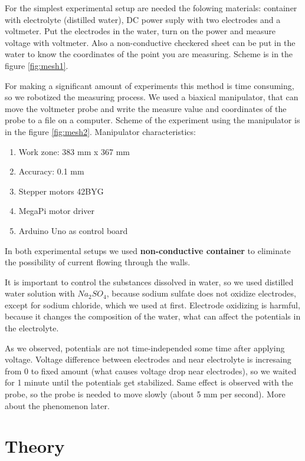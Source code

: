 \documentclass{article}
\begin{document}
For the simplest experimental setup are needed the folowing materials: container with electrolyte (distilled water), DC power suply with two electrodes and a voltmeter. Put the electrodes in the water, turn on the power and measure voltage with voltmeter. Also a non-conductive checkered sheet can be put in the water to know the coordinates of the point you are measuring. Scheme is in the figure \ref{fig:mesh1}.  \par

For making a significant amount of experiments this method is time consuming, so we robotized the measuring process. We used a biaxical manipulator, that can move the voltmeter probe and write the measure value and coordinates of the probe to a file on a computer. Scheme of the experiment using the manipulator is in the figure \ref{fig:mesh2}. Manipulator characteristics:
\begin{enumerate}
\item Work zone: 383 mm x 367 mm
\item Accuracy: 0.1 mm
\item Stepper motors 42BYG
\item MegaPi motor driver
\item Arduino Uno as control board
\end{enumerate}

In both experimental setups we used \textbf{non-conductive container} to eliminate the possibility of current flowing through the walls.\par

It is important to control the substances dissolved in water, so we used distilled water solution with $Na_2SO_4$, because sodium sulfate does not oxidize electrodes, except for sodium chloride, which we used at first. Electrode oxidizing is harmful, because it changes the composition of the water, what can affect the potentials in the electrolyte.\par

As we observed, potentials are not time-independed some time after applying voltage. Voltage difference between electrodes and near electrolyte is incresaing from 0 to fixed amount (what causes voltage drop near electrodes), so we waited for 1 minute until the potentials get stabilized. Same effect is observed with the probe, so the probe is needed to move slowly (about 5 mm per second). More about the phenomenon later. \par


\section{Theory}
\end{document}
